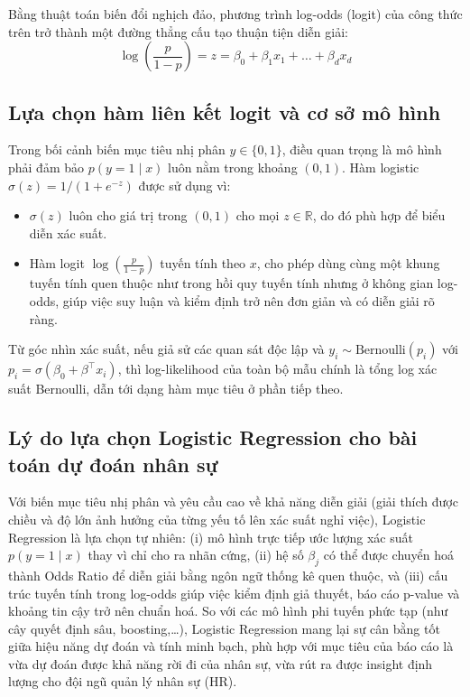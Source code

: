 Bằng thuật toán biến đổi nghịch đảo, phương trình log-odds (logit) của công thức trên trở thành một đường thẳng cấu tạo thuận tiện diễn giải:
\[
\log\left(\frac{p}{1-p}\right) = z = \beta_0 + \beta_1 x_1 + \dots + \beta_d x_d
\]

\subsection{Lựa chọn hàm liên kết logit và cơ sở mô hình}
Trong bối cảnh biến mục tiêu nhị phân \(y \in \{0,1\}\), điều quan trọng là mô hình phải đảm bảo \(p(y=1\mid x)\) luôn nằm trong khoảng \((0,1)\). Hàm logistic \(\sigma(z) = 1/(1+e^{-z})\) được sử dụng vì:
\begin{itemize}
  \item \(\sigma(z)\) luôn cho giá trị trong \((0,1)\) cho mọi \(z \in \mathbb{R}\), do đó phù hợp để biểu diễn xác suất.
  \item Hàm logit \(\log\left(\frac{p}{1-p}\right)\) tuyến tính theo \(x\), cho phép dùng cùng một khung tuyến tính quen thuộc như trong hồi quy tuyến tính nhưng ở không gian log-odds, giúp việc suy luận và kiểm định trở nên đơn giản và có diễn giải rõ ràng.
\end{itemize}
Từ góc nhìn xác suất, nếu giả sử các quan sát độc lập và \(y_i \sim \text{Bernoulli}(p_i)\) với \(p_i = \sigma(\beta_0 + \beta^\top x_i)\), thì log-likelihood của toàn bộ mẫu chính là tổng log xác suất Bernoulli, dẫn tới dạng hàm mục tiêu ở phần tiếp theo.
\subsection{Lý do lựa chọn Logistic Regression cho bài toán dự đoán nhân sự}
Với biến mục tiêu nhị phân và yêu cầu cao về khả năng diễn giải (giải thích được chiều và độ lớn ảnh hưởng của từng yếu tố lên xác suất nghỉ việc), Logistic Regression là lựa chọn tự nhiên: 
 (i) mô hình trực tiếp ước lượng xác suất \(p(y=1\mid x)\) thay vì chỉ cho ra nhãn cứng, 
 (ii) hệ số \(\beta_j\) có thể được chuyển hoá thành Odds Ratio để diễn giải bằng ngôn ngữ thống kê quen thuộc, 
và (iii) cấu trúc tuyến tính trong log-odds giúp việc kiểm định giả thuyết, báo cáo p-value và khoảng tin cậy trở nên chuẩn hoá. 
So với các mô hình phi tuyến phức tạp (như cây quyết định sâu, boosting,\ldots), Logistic Regression mang lại sự cân bằng tốt giữa hiệu năng dự đoán và tính minh bạch, phù hợp với mục tiêu của báo cáo là vừa dự đoán được khả năng rời đi của nhân sự, vừa rút ra được insight định lượng cho đội ngũ quản lý nhân sự (HR).

